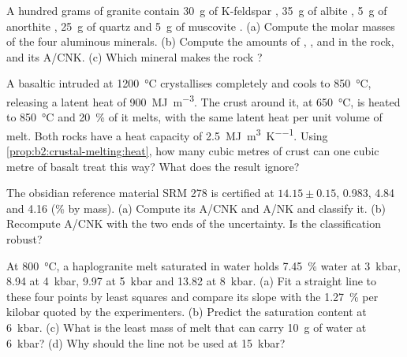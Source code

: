 \begin{exercise}[$\star\star$]\label{exo:b2:crustal-melting:6}
A hundred grams of granite contain \qty{30}{\gram} of K-feldspar ,
\qty{35}{\gram} of albite , \qty{5}{\gram} of anorthite ,
\qty{25}{\gram} of quartz and \qty{5}{\gram} of muscovite .
(a) Compute the molar masses of the four aluminous minerals. (b) Compute the amounts of
, ,  and  in the rock, and its A/CNK. (c) Which
mineral makes the rock ?
\end{exercise}

\begin{exercise}[$\star\star$]\label{exo:b2:crustal-melting:7}
A basaltic  intruded at \qty{1200}{\celsius} crystallises completely and cools to
\qty{850}{\celsius}, releasing a latent heat of \qty{900}{\mega\joule\per\cubic\metre}.
The crust around it, at \qty{650}{\celsius}, is heated to \qty{850}{\celsius} and
\qty{20}{\percent} of it melts, with the same latent heat per unit volume of melt. Both
rocks have a heat capacity of \qty{2.5}{\mega\joule\per\cubic\metre\per\kelvin}. Using
\cref{prop:b2:crustal-melting:heat}, how many cubic metres of crust can one cubic metre
of basalt treat this way? What does the result ignore?
\end{exercise}

\begin{exercise}[$\star\star$]\label{exo:b2:crustal-melting:8}
The obsidian reference material SRM 278 is certified at 
$14.15 \pm 0.15$,  0.983,  4.84 and  4.16 (\unit{\percent} by
mass). (a) Compute its A/CNK and A/NK and classify it. (b) Recompute A/CNK with the two
ends of the  uncertainty. Is the classification robust?
\end{exercise}

\begin{exercise}[$\star\star$]\label{exo:b2:crustal-melting:9}
At \qty{800}{\celsius}, a haplogranite melt saturated in water holds \qty{7.45}{\percent}
water at \qty{3}{kbar}, 8.94 at \qty{4}{kbar}, 9.97 at \qty{5}{kbar} and 13.82 at
\qty{8}{kbar}. (a) Fit a straight line to these four points by least squares and compare
its slope with the \qty{1.27}{\percent} per kilobar quoted by the experimenters.
(b) Predict the saturation content at \qty{6}{kbar}. (c) What is the least mass of melt
that can carry \qty{10}{\gram} of water at \qty{6}{kbar}? (d) Why should the line not be
used at \qty{15}{kbar}?
\end{exercise}

